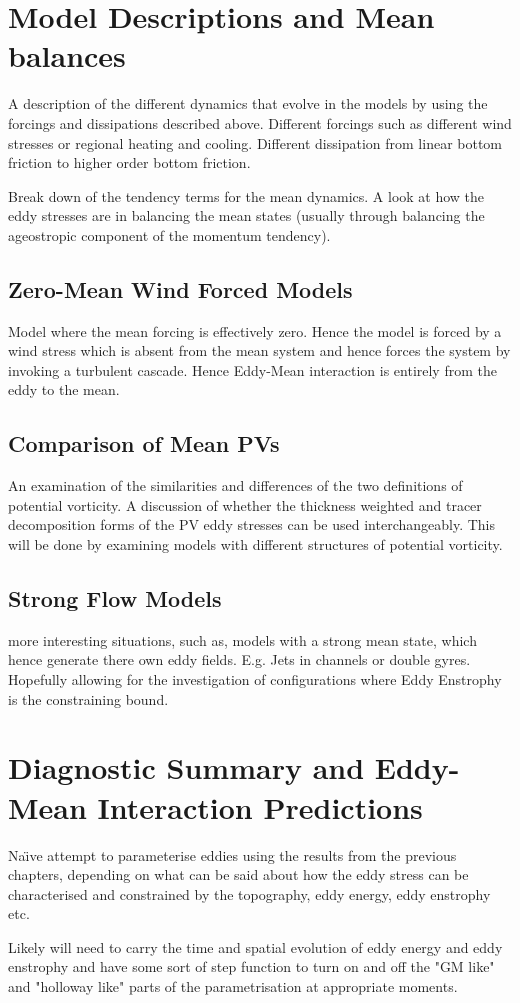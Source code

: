 \documentclass[10pt,a4paper]{article}
\begin{document}
\section{Model Descriptions and Mean balances}

A description of the different dynamics that evolve
in the models by using the forcings and 
dissipations described above. Different forcings
such as different wind stresses or regional heating
and cooling. Different dissipation from
linear bottom friction to higher order bottom
friction.

Break down of the tendency terms for the mean
dynamics. A look at how the eddy stresses are 
in balancing the mean states (usually through
balancing the ageostropic component of the
momentum tendency).

\subsection{Zero-Mean Wind Forced Models}

Model where the mean forcing is effectively zero. 
Hence the model is forced by a wind stress which is
absent from the mean system and hence forces the
system by 
invoking a turbulent cascade. Hence Eddy-Mean
interaction is entirely from the eddy to the mean.

\subsection{Comparison of Mean PVs}

An examination of the similarities and differences
of the two definitions of potential vorticity. 
A discussion of whether the thickness
weighted and tracer decomposition forms of the
PV eddy stresses can be used interchangeably.
This will be done by examining models with
different structures of potential vorticity.

\subsection{Strong Flow Models}

more interesting situations, such as, models
with a strong mean state, which hence
generate there own eddy fields. E.g. Jets in
channels or double gyres. Hopefully allowing 
for the investigation of configurations where 
Eddy Enstrophy is the constraining bound.


\section{Diagnostic Summary and Eddy-Mean Interaction Predictions}

Na\"{\i}ve attempt to parameterise eddies using the 
results from the previous chapters, depending
on what can be said about how the eddy stress can
be characterised and constrained by the topography,
eddy energy, eddy enstrophy etc. 

Likely will need to carry the time and spatial
evolution of eddy energy and eddy enstrophy and have
some sort of step function to turn on and off the
"GM like" and "holloway like" parts of the parametrisation at appropriate moments.
\end{document}
